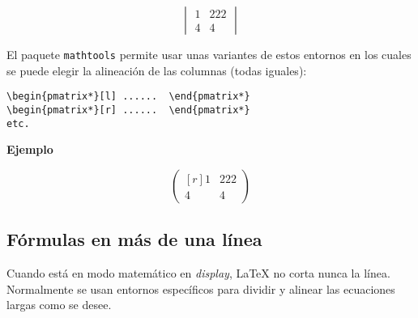 \documentclass[11pt,a4paper]{report}
\begin{document}
\begin{equation*}
\begin{vmatrix}
1 & 222 \\ 4 & 4
\end{vmatrix}
\end{equation*}

\bigskip




El paquete \texttt{mathtools} permite usar unas variantes de estos entornos en los cuales se puede elegir la alineación de las columnas (todas iguales):
\begin{verbatim}
\begin{pmatrix*}[l] ......  \end{pmatrix*}
\begin{pmatrix*}[r] ......  \end{pmatrix*}
etc.
\end{verbatim}




\bigskip
\textbf{Ejemplo}

\begin{equation*}
\begin{pmatrix*}[r]
1 & 222 \\ 4 & 4
\end{pmatrix*}
\end{equation*}

\bigskip







\subsection{Fórmulas en más de una línea}





Cuando está en modo matemático en \emph{display}, \LaTeX{} no corta nunca la línea.
Normalmente se usan entornos específicos para dividir y alinear las ecuaciones largas como se desee.
\end{document}
